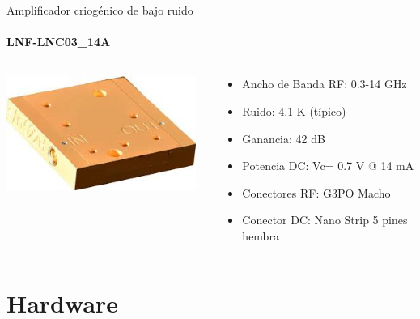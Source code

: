 \documentclass[ignorenonframetext,12pt]{beamer}
\begin{document}
				\begin{frame}{Amplificador criog\'enico de bajo ruido}
								\framesubtitle{LNF-LNC03\_14A}
								\begin{columns}
												\begin{column}{0.40\textwidth}
																\hspace{10mm}\includegraphics[width=0.95\textwidth]{lnf-lnc03_14sa}
												\end{column}
												\begin{column}{0.60\textwidth}
																\begin{itemize}
																				\item Ancho de Banda RF: 0.3-14 GHz
																				\item Ruido: 4.1 K (típico)
																				\item Ganancia: 42 dB
																				\item Potencia DC: Vc= 0.7 V @ 14 mA
																				\item Conectores RF: G3PO Macho
																				\item Conector DC: Nano Strip 5 pines hembra
																\end{itemize}
												\end{column}
								\end{columns}
				\end{frame}

\section{Hardware}
\end{document}
